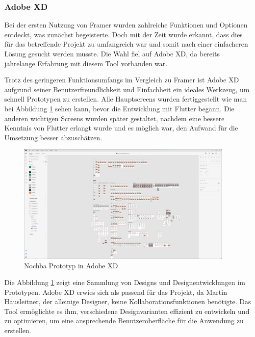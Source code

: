 \subsubsection{Adobe XD}
Bei der ersten Nutzung von Framer wurden zahlreiche Funktionen und Optionen entdeckt, was zunächst begeisterte. Doch mit der Zeit wurde erkannt, dass dies für das betreffende Projekt zu umfangreich war und somit nach einer einfacheren Lösung gesucht werden musste. Die Wahl fiel auf Adobe XD, da bereits jahrelange Erfahrung mit diesem Tool vorhanden war.

Trotz des geringeren Funktionsumfangs im Vergleich zu Framer
ist Adobe XD aufgrund seiner Benutzerfreundlichkeit und
Einfachheit ein ideales Werkzeug, um schnell Prototypen zu
erstellen. Alle Hauptscreens wurden fertiggestellt wie man
bei Abbildung \ref{fig:adobexd-prototyp} sehen kann, bevor
die Entwicklung mit Flutter begann. Die anderen wichtigen
Screens wurden später gestaltet, nachdem eine bessere
Kenntnis von Flutter erlangt wurde und es möglich war, den
Aufwand für die Umsetzung besser abzuschätzen.

\begin{figure}[h]
  \centering
  \includegraphics[width=0.95\textwidth]{pics/nochba-adobe-xd-protoype-screenshot.png}
  \caption{Nochba Prototyp in Adobe XD}
  \label{fig:adobexd-prototyp}
\end{figure}

Die Abbildung \ref{fig:adobexd-prototyp} zeigt eine Sammlung von Designs und Designentwicklungen im Prototypen. Adobe XD erwies sich als passend für das Projekt, da Martin Hausleitner, der alleinige Designer, keine Kollaborationsfunktionen benötigte. Das Tool ermöglichte es ihm, verschiedene Designvarianten effizient zu entwickeln und zu optimieren, um eine ansprechende Benutzeroberfläche für die Anwendung zu erstellen.

